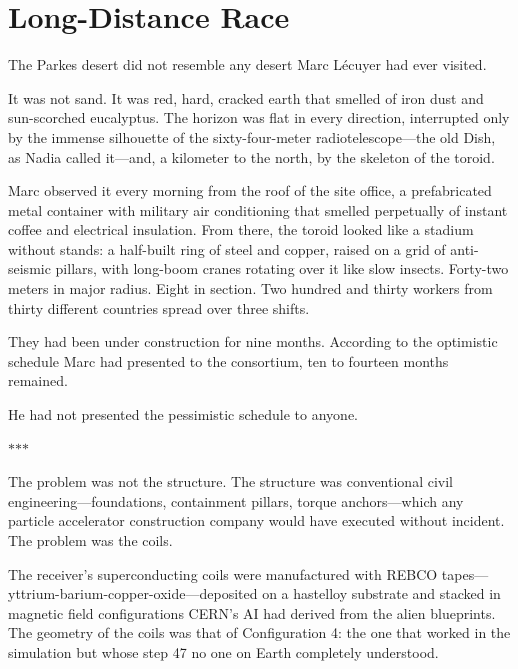 \documentclass[11pt,a5paper,twoside]{book}
\begin{document}
\chapter{Long-Distance Race}

The Parkes desert did not resemble any desert Marc Lécuyer had ever visited.

It was not sand. It was red, hard, cracked earth that smelled of iron dust and sun-scorched eucalyptus. The horizon was flat in every direction, interrupted only by the immense silhouette of the sixty-four-meter radiotelescope—the old Dish, as Nadia called it—and, a kilometer to the north, by the skeleton of the toroid.

Marc observed it every morning from the roof of the site office, a prefabricated metal container with military air conditioning that smelled perpetually of instant coffee and electrical insulation. From there, the toroid looked like a stadium without stands: a half-built ring of steel and copper, raised on a grid of anti-seismic pillars, with long-boom cranes rotating over it like slow insects. Forty-two meters in major radius. Eight in section. Two hundred and thirty workers from thirty different countries spread over three shifts.

They had been under construction for nine months. According to the optimistic schedule Marc had presented to the consortium, ten to fourteen months remained.

He had not presented the pessimistic schedule to anyone.

\vspace{1.5em}
\begin{center}$\ast$\quad$\ast$\quad$\ast$\end{center}
\vspace{1.5em}

The problem was not the structure. The structure was conventional civil engineering—foundations, containment pillars, torque anchors—which any particle accelerator construction company would have executed without incident. The problem was the coils.

The receiver's superconducting coils were manufactured with REBCO tapes—yttrium-barium-copper-oxide—deposited on a hastelloy substrate and stacked in magnetic field configurations CERN's AI had derived from the alien blueprints. The geometry of the coils was that of Configuration 4: the one that worked in the simulation but whose step 47 no one on Earth completely understood.
\end{document}
